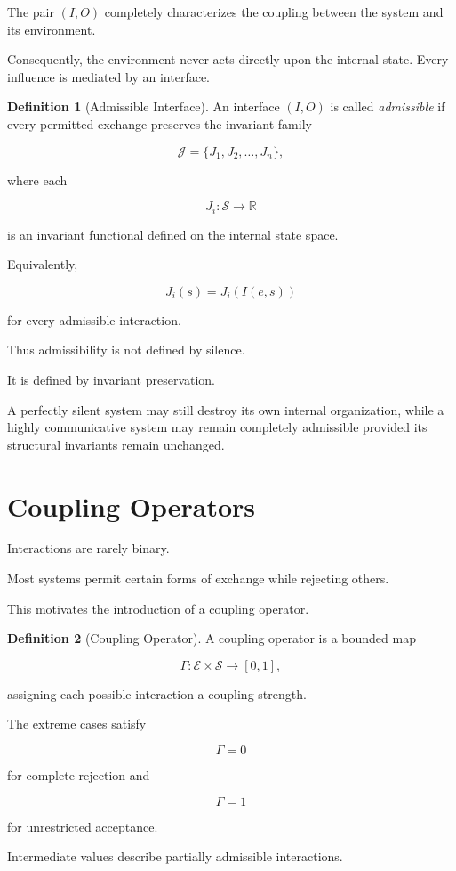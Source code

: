 \documentclass[11pt,oneside]{book}
\numberwithin{equation}{chapter}
\theoremstyle{definition}
\newtheorem{definition}{Definition}[chapter]
\theoremstyle{plain}
\begin{document}
The pair $(I,O)$ completely characterizes the coupling between the system and
its environment.

Consequently, the environment never acts directly upon the internal state.
Every influence is mediated by an interface.

\begin{definition}[Admissible Interface]

An interface $(I,O)$ is called \emph{admissible} if every permitted exchange
preserves the invariant family

\[
\mathcal{J}
=
\{
J_1,
J_2,
\ldots,
J_n
\},
\]

where each

\[
J_i:\mathcal{S}\rightarrow\mathbb{R}
\]

is an invariant functional defined on the internal state space.

Equivalently,

\[
J_i(s)=J_i(I(e,s))
\]

for every admissible interaction.

\end{definition}

Thus admissibility is not defined by silence.

It is defined by invariant preservation.

A perfectly silent system may still destroy its own internal organization,
while a highly communicative system may remain completely admissible provided
its structural invariants remain unchanged.

\section{Coupling Operators}

Interactions are rarely binary.

Most systems permit certain forms of exchange while rejecting others.

This motivates the introduction of a coupling operator.

\begin{definition}[Coupling Operator]

A coupling operator is a bounded map

\[
\Gamma:
\mathcal{E}
\times
\mathcal{S}
\rightarrow
[0,1],
\]

assigning each possible interaction a coupling strength.

The extreme cases satisfy

\[
\Gamma=0
\]

for complete rejection and

\[
\Gamma=1
\]

for unrestricted acceptance.

Intermediate values describe partially admissible interactions.

\end{definition}
\end{document}
